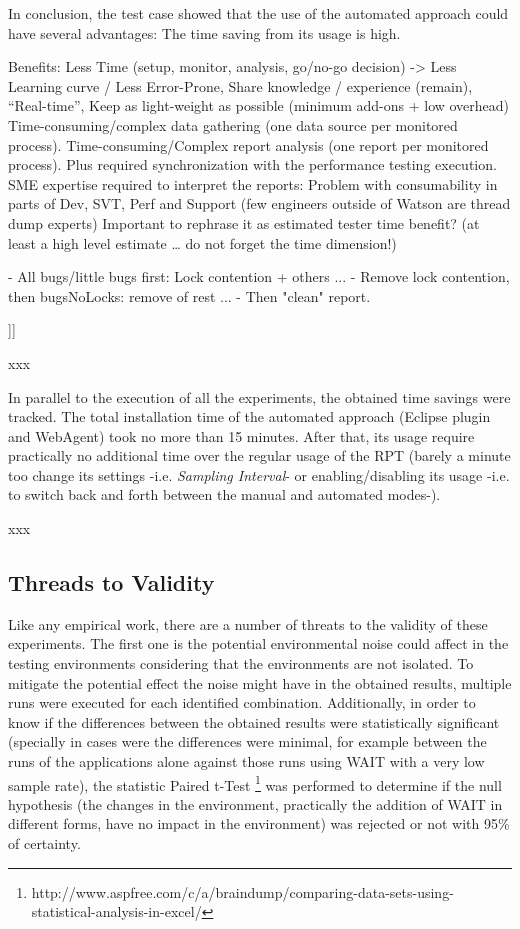 \documentclass[runningheads,a4paper]{llncs}
\begin{document}
In conclusion, the test case showed that the use of the automated approach
could have several advantages: The time saving from its usage is high.

Benefits: Less Time (setup, monitor, analysis, go/no-go decision) -> Less
Learning curve / Less Error-Prone, Share knowledge / experience (remain), “Real-time”, Keep as light-weight as possible (minimum add-ons + low overhead)
Time-consuming/complex data gathering (one data source per monitored process).
Time-consuming/Complex report analysis (one report per monitored process).
Plus required synchronization with the performance testing execution.
SME expertise required to interpret the reports: Problem with consumability in
parts of Dev, SVT, Perf and Support (few engineers outside of Watson are thread dump experts)
Important to rephrase it as estimated tester time benefit? (at least a high
level estimate … do not forget the time dimension!)

- All bugs/little bugs first: Lock contention + others ...
- Remove lock contention, then bugsNoLocks: remove of rest ...
- Then "clean" report.

]]

xxx

In parallel to the execution of all the experiments, the obtained time savings
were tracked. The total installation time of the automated approach (Eclipse
plugin and WebAgent) took no more than 15 minutes. After that, its usage require
practically no additional time over the regular usage of the RPT (barely a
minute too change its settings -i.e. \emph{Sampling Interval}- or
enabling/disabling its usage -i.e. to switch back and forth between the manual
and automated modes-). 

xxx

\subsection{Threads to Validity}

Like any empirical work, there are a number of threats to the validity of these
experiments. The first one is the potential environmental noise could affect in
the testing environments considering that the environments are not isolated. To
mitigate the potential effect the noise might have in the obtained results, multiple runs 
were executed for each identified combination. Additionally, in order to know if
the differences between the obtained results were statistically significant (specially in cases 
were the differences were minimal, for example between the runs of the
applications alone against those runs using WAIT with a very low sample rate), the statistic Paired t-Test
\footnote{http://www.aspfree.com/c/a/braindump/comparing-data-sets-using-statistical-analysis-in-excel/}
was performed to determine if the null hypothesis (the changes in the
environment, practically the addition of WAIT in different forms, have no
impact in the environment) was rejected or not with 95\% of certainty.
\end{document}
